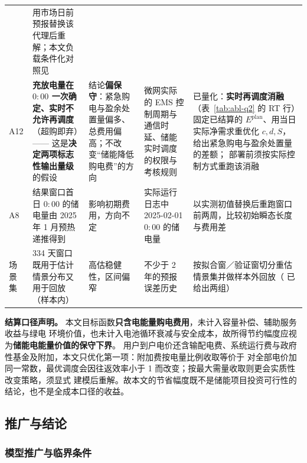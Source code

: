 \begin{table}[htbp]
\begin{tabularx}{\linewidth}{C{0.95cm} L{3.35cm} C{1.25cm} L{3.15cm} Y}
      & 用市场日前预报替换该代理后重解；本文负载条件化对照见  \\
    A12 & \textbf{充放电量在 \(0{:}00\) 一次确定、实时不允许再调度}（超购即弃）——
        这是\textbf{决定两项标志性输出量级}的假设 & 结论\textbf{偏保守}：紧急购电与盈余处置量偏多、
        总费用偏高；不改变“储能降低购电费”的方向
      & 微网实际的 EMS 控制周期与通信时延、储能实时调度的权限与考核规则
      & 已量化：\textbf{实时再调度消融}（表~\ref{tab:abl-q2} 的 RT 行）固定已结算的
        \(E^{\text{plan}}\)、用当日实际净需求重优化 \(c,d,S\)，给出紧急购电与盈余处置量的差额；
        部署前须按实际控制方式重跑该消融 \\
    A8 & 结果窗口首日 \(0{:}00\) 的储电量由 2025 年 1 月预热递推得到 & 影响初期费用，方向不定
      & 实际运行日志中 2025-02-01 \(0{:}00\) 的储电量
      & 以实测初值替换后重跑窗口前两周，比较初始瞬态长度与费用差 \\
    场景集 & 334 天窗口既用于估计情景分布又用于回放（样本内） & 高估稳健性，区间偏窄
      & 不少于 2 年的预报误差历史
      & 按拟合窗／验证窗切分重估情景集并做样本外回放（ 已给出两组） \\
    \bottomrule
  \end{tabularx}
\end{table}

\textbf{结算口径声明。} 本文目标函数\textbf{只含电能量购电费用}，未计入容量补偿、辅助服务收益与绿电
环境价值，也未计入电池循环衰减与安全成本，故所得节约幅度应视为\textbf{储能电能量价值的保守下界}。
用户到户电价还含输配电费、系统运行费与政府性基金及附加，本文只优化第一项：附加费按电量比例收取等价于
对全部电价加同一常数，最优调度会因往返效率小于 1 而改变；按最大需量收取则更会实质性改变策略，须显式
建模后重解。故本文的节省幅度既不是储能项目投资可行性的结论，也不是全成本口径的收益。

\subsection{推广与结论}

\subsubsection{模型推广与临界条件}

